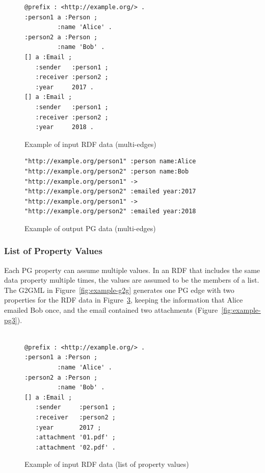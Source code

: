 \documentclass[runningheads]{llncs}
\begin{document}
\begin{figure}[!t]
\begin{scriptsize}
\begin{verbatim}
@prefix : <http://example.org/> .
:person1 a :Person ;
         :name 'Alice' .
:person2 a :Person ;
         :name 'Bob' .
[] a :Email ;
   :sender   :person1 ;
   :receiver :person2 ;
   :year     2017 .
[] a :Email ;
   :sender   :person1 ;
   :receiver :person2 ;
   :year     2018 .
\end{verbatim}
\end{scriptsize}
\caption{Example of input RDF data (multi-edges)}
\label{fig:example-rdf2}
\end{figure}


\begin{figure}[!t]
\begin{scriptsize}
\begin{verbatim}
"http://example.org/person1" :person name:Alice
"http://example.org/person2" :person name:Bob
"http://example.org/person1" -> "http://example.org/person2" :emailed year:2017
"http://example.org/person1" -> "http://example.org/person2" :emailed year:2018
\end{verbatim}
\end{scriptsize}
\caption{Example of output PG data (multi-edges)}
\label{fig:example-pg2}
\end{figure}

\subsubsection{List of Property Values}
Each PG property can assume multiple values. In an RDF that includes the same data property multiple times, the values are assumed to be the members of a list. The G2GML in Figure~\ref{fig:example-g2g} generates one PG edge with two properties for the RDF data in Figure~\ref{fig:example-rdf3}, keeping the information that Alice emailed Bob once, and the email contained two attachments (Figure~\ref{fig:example-pg3}).


\begin{figure}[!t]
\begin{scriptsize}
\begin{verbatim}

@prefix : <http://example.org/> .
:person1 a :Person ;
         :name 'Alice' .
:person2 a :Person ;
         :name 'Bob' .
[] a :Email ;
   :sender     :person1 ;
   :receiver   :person2 ;
   :year       2017 ;
   :attachment '01.pdf' ;
   :attachment '02.pdf' .

\end{verbatim}
\end{scriptsize}
\caption{Example of input RDF data (list of property values)}
\label{fig:example-rdf3}
\end{figure}
\end{document}
